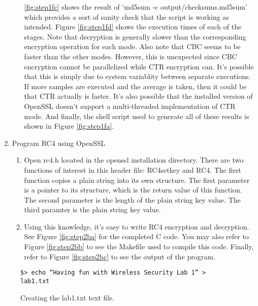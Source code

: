 \documentclass{article}
\begin{document}
\begin{enumerate}
\begin{enumerate}
              \ref{fig:step1fc} shows the result of `md5sum -c output/checksums.md5sum' which provides a sort of
              sanity check that the script is working as intended. Figure \ref{fig:step1fd} shows the execution
              times of each of the stages. Note that decryption is generally slower than the corresponding encryption
              operation for each mode. Also note that CBC seems to be faster than the other modes. However, this is
              unexpected since CBC encryption cannot be parallelized while CTR encryption can. It's possible that this
              is simply due to system variablity between separate executions. If more samples are executed and the average
              is taken, then it could be that CTR actually is faster. It's also possible that the installed version
              of OpenSSL doesn't support a multi-threaded implementation of CTR mode. And finally, the shell
              script used to generate all of these results is shown in Figure \ref{fig:step1fa}.
    \end{enumerate}
\item \label{step2} Program RC4 using OpenSSL
    \begin{enumerate}
        \item Open rc4.h located in the openssl installation directory. There are two functions of interest in this
              header file: RC4\textunderscore set\textunderscore key and RC4. The first function copies a plain string
              into its own structure. The first parameter is a pointer to its structure, which is the return value of
              this function. The second parameter is the length of the plain string key value. The third paramter is the
              plain string key value.
        \item Using this knowledge, it's easy to write RC4 encryption and decryption. See Figure \ref{fig:step2ba} for the
              completed C code.  You may also refer to Figure \ref{fig:step2bb} to see the Makefile used to compile this code.
              Finally, refer to Figure \ref{fig:step2bc} to see the output of the program.
    \end{enumerate}
\end{enumerate}

\begin{figure}
\begin{mdframed}
\begin{lstlisting}
$> echo “Having fun with Wireless Security Lab 1” > lab1.txt
\end{lstlisting}
\end{mdframed}
\caption{Creating the lab1.txt text file.}
\label{fig:step1a}
\end{figure}
\end{document}

